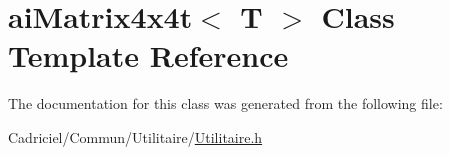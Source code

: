 \hypertarget{classai_matrix4x4t}{}\section{ai\+Matrix4x4t$<$ T $>$ Class Template Reference}
\label{classai_matrix4x4t}


The documentation for this class was generated from the following file\+:\begin{DoxyCompactItemize}
\item 
Cadriciel/\+Commun/\+Utilitaire/\hyperlink{_utilitaire_8h}{Utilitaire.\+h}\end{DoxyCompactItemize}
